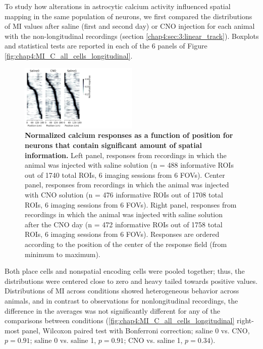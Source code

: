 To study how alterations in astrocytic calcium activity influenced spatial mapping in the same population of neurons, we first compared the distributions of MI values after saline (first and second day) or CNO injection for each animal with the non-longitudinal recordings (section \ref{chap4:sec:3:linear_track}).
Boxplots and statistical tests are reported in each of the 6 panels of Figure \ref{fig:chap4:MI_C_all_cells_longitudinal}.
\begin{figure}
    \centering
    \includegraphics[trim={0 0 450 0},clip,width=0.5\textwidth]{Figures/Chapter4/snake_plots_long.pdf}
    \caption[Normalized calcium responses as a function of position for neurons that contain significant amount of spatial information]{\textbf{Normalized calcium responses as a function of position for neurons that contain significant amount of spatial information.} 
    Left panel, responses from recordings in which the animal was injected with saline solution (n = 488 informative ROIs out of 1740 total ROIs, 6 imaging sessions from 6 FOVs). 
    Center panel, responses from recordings in which the animal was injected with CNO solution (n = 476 informative ROIs out of 1708 total ROIs, 6 imaging sessions from 6 FOVs). 
    Right panel, responses from recordings in which the animal was injected with saline solution after the CNO day (n = 472 informative ROIs out of 1758 total ROIs, 6 imaging sessions from 6 FOVs). 
    Responses are ordered according to the position of the center of the response field (from minimum to maximum).}
    \label{fig:chap4:snake_plots_long}
\end{figure}
Both place cells and nonspatial encoding cells were pooled together; thus, the distributions were centered close to zero and heavy tailed towards positive values.
Distributions of MI across conditions showed heterogeneous behavior across animals, and in contrast to observations for nonlongitudinal recordings, the difference in the averages was not significantly different for any of the comparisons between conditions (\ref{fig:chap4:MI_C_all_cells_longitudinal} right-most panel, Wilcoxon paired test with Bonferroni correction; saline 0 vs. CNO, $p=0.91$; saline 0 vs. saline 1, $p=0.91$; CNO vs. saline 1, $p=0.34$).

